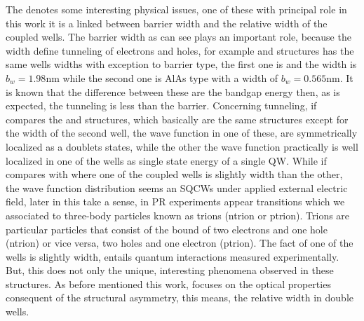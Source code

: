 The  denotes some interesting physical issues, one of these with principal role in this work it is a linked between barrier width and the relative width of the coupled wells.          
The barrier width as can see plays an important role, because the width define tunneling of electrons and holes, for example  and   structures has the same wells widths with exception to barrier type, the first one is  and the width is $b_{w}=1.98$nm while the second one is AlAs type with a width of $b_{w}=0.565$nm. It is known that the difference between these are the bandgap energy then, as is expected, the tunneling is less than the   barrier. Concerning tunneling, if compares the  and  structures, which basically are the same structures except for the width of the second well, the wave function in one of these,  are symmetrically localized as a doublets states, while the other the wave function practically is well localized in one of the wells as single state energy of a single QW\cite{sivalertporn2016effectofbarrier}. While if compares with  where one of the coupled wells is slightly  width than the other, the wave function distribution seems an SQCWs under applied external electric field\cite{sivalertporn2012direct}, later in  this take a sense, in \gls{PR} experiments appear transitions which we associated to three-body particles known as trions (\gls{ntrion} or \gls{ptrion}). Trions are particular particles that consist of the bound of two electrons and one hole (\gls{ntrion}) or vice versa, two holes and one electron (\gls{ptrion}). The fact of one of the wells is slightly width, entails quantum interactions measured experimentally. But, this does not only the unique, interesting phenomena observed in these structures. As before mentioned this work, focuses on the optical properties consequent of the structural asymmetry, this means, the relative width in double wells. 
     

